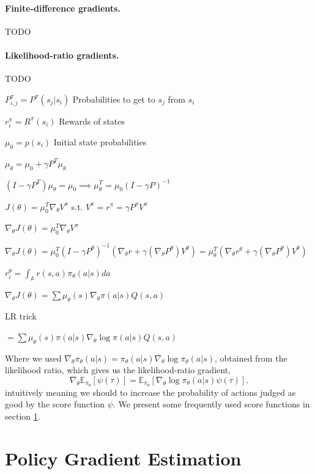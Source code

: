 \paragraph{Finite-difference gradients.} TODO

\paragraph{Likelihood-ratio gradients.} TODO


$P^\pi_{i,j}=P^\pi(s_j|s_i)$ Probabilities to get to $s_j$ from $s_i$

$r^\pi_i=R^\pi(s_i)$ Rewards of states

$\mu_0=p(s_i)$ Initial state probabilities


$\mu_\theta = \mu_0 + \gamma P^T \mu_\theta$

$(I - \gamma P^T)\mu_\theta = \mu_0 \implies \mu_\theta^T = \mu_0(I-\gamma P)^{-1}$

$J(\theta) = \mu_0^T \nabla_\theta V^\pi$ s.t. $V^\pi = r^\pi = \gamma P^\pi V^\pi$

$\nabla_\theta J(\theta) = \mu_0^T \nabla_\theta V^\pi$

$\nabla_\theta J(\theta) = \mu_0^T (I - \gamma P^\theta)^{-1} (\nabla_\theta r + \gamma (\nabla_\theta P^\theta) V^\theta) = \mu_\theta^T (\nabla_\theta r^\theta + \gamma (\nabla_\theta P^\theta) V^\theta)$

$r_i^\theta = \int_\mathbb{A} r(s,a)\pi_\theta(a|s) da$

$\nabla_\theta J(\theta) = \sum \mu_\theta(s) \nabla_\theta\pi(a|s) Q(s,a)$

LR trick

$ = \sum \mu_\theta(s) \pi(a|s) \nabla_\theta\log\pi(a|s) Q(s,a)$

Where we used $\nabla_\theta \pi_\theta(a|s) = \pi_\theta(a|s)\nabla_\theta\log\pi_\theta(a|s)$, obtained from the likelihood ratio, which gives us the likelihood-ratio gradient,
\begin{equation}
  \nabla_\theta \mathbb{E}_{\pi_\theta}\left[\psi(\tau)\right] = \mathbb{E}_{\pi_\theta}\left[\nabla_\theta{\log\pi_\theta(a|s)}\psi(\tau)\right].
  \label{eqn:like-grad}
\end{equation}
intuitively meaning we should to increase the probability of actions judged as good by the score function $\psi$. We present some frequently used score functions in section \ref{sec:pge}.

\section{Policy Gradient Estimation}
\label{sec:pge}

